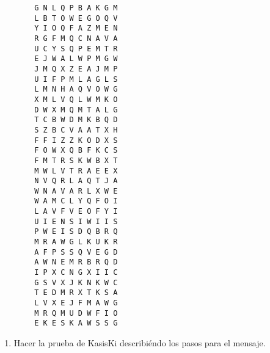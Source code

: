 \documentclass[letterpaper,10pt]{article}
\begin{document}
\begin{enumerate}
\begin{multicols}{4}
\begin{verbatim}
        G N L Q P B A K G M
        L B T O W E G O Q V
        Y I O Q F A Z M E N
        R G F M Q C N A V A
        U C Y S Q P E M T R
        E J W A L W P M G W
        J M Q X Z E A J M P
        U I F P M L A G L S
        L M N H A Q V O W G
        X M L V Q L W M K O
        D W X M Q M T A L G
        T C B W D M K B Q D
        S Z B C V A A T X H
        F F I Z Z K O D X S
        F O W X Q B F K C S
        F M T R S K W B X T
        M W L V T R A E E X
        N V Q R L A Q T J A
        W N A V A R L X W E
        W A M C L Y Q F O I
        L A V F V E O F Y I
        U I E N S I W I I S
        P W E I S D Q B R Q
        M R A W G L K U K R
        A F P S S Q V E G D
        A W N E M R B R Q D
        I P X C N G X I I C
        G S V X J K N K W C
        T E D M R X T K S A
        L V X E J F M A W G
        M R Q M U D W F I O
        E K E S K A W S S G
    \end{verbatim}
    \end{multicols}
    
    \begin{enumerate}
        \item Hacer la prueba de KasisKi describiéndo los pasos para el 
        mensaje.
        

\end{enumerate}
\end{enumerate}
\end{document}
